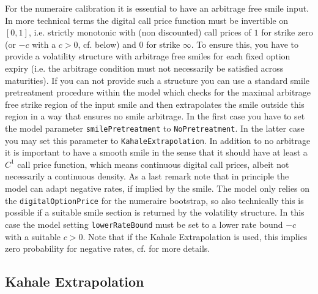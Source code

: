 \documentclass{amsart}
\theoremstyle{plain}
\numberwithin{equation}{section}
\begin{document}
For the numeraire calibration it is essential to have an arbitrage free smile input. In more technical terms the digital call price function must
be invertible on $[0,1]$, i.e. strictly monotonic with (non discounted) call prices of $1$ for strike zero (or $-c$ with a $c>0$, cf. below) and $0$ for strike $\infty$. To ensure this, you have
to provide a volatility structure with arbitrage free smiles for each fixed option expiry (i.e. the arbitrage condition must not necessarily be satisfied 
across maturities). If you can not provide such a structure you can use a standard smile pretreatment procedure within the model which checks for the 
maximal arbitrage free strike region of the input smile and then extrapolates the smile outside this region in a way that ensures no smile arbitrage.
In the first case you have to set the model parameter \verb+smilePretreatment+ to \verb+NoPretreatment+. In the latter case you may set this parameter
to \verb+KahaleExtrapolation+.
In addition to no arbitrage it is important to have a smooth smile in the sense that it should have at least a $C^1$ call price function, which means
continuous digital call prices, albeit not necessarily a continuous density.
As a last remark note that in principle the model can adapt negative rates, if implied by the smile. The model only relies on the \verb+digitalOptionPrice+ for
the numeraire bootstrap, so also technically this is possible if a suitable smile section is returned by the volatility structure. In this case the model setting \verb+lowerRateBound+ must be set to a lower rate bound $-c$ with a suitable $c>0$. Note that if the Kahale Extrapolation is used, this implies zero probability for negative rates, cf. \cite{Kahale} for more details.

\subsection{Kahale Extrapolation}
\end{document}
